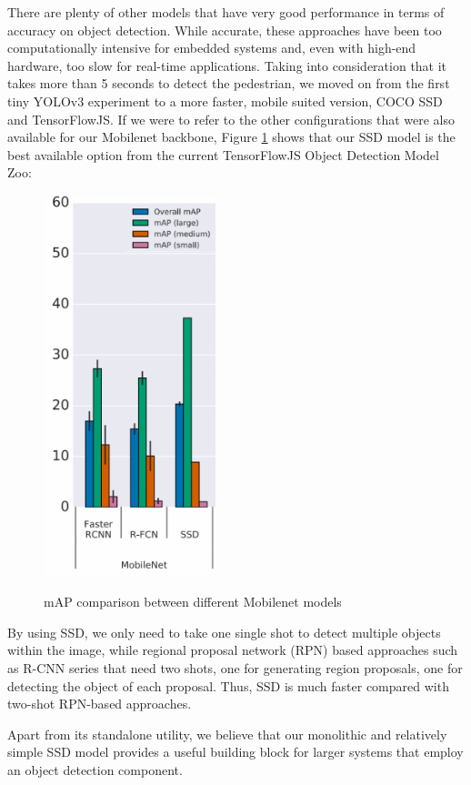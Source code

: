 \documentclass[runningheads,a4paper,11pt]{report}
\begin{document}
There are plenty of other models that have very good performance in terms of accuracy on object detection. While accurate, these approaches have been too computationally intensive for embedded systems and, even with high-end hardware, too slow for real-time applications. Taking into consideration that it takes more than 5 seconds to detect the pedestrian, we moved on from the first tiny YOLOv3 experiment to a more faster, mobile suited version, COCO SSD and TensorFlowJS. If we were to refer to the other configurations that were also available for our Mobilenet backbone, Figure \ref{fig:mob} shows that our SSD model is the best available option from the current TensorFlowJS Object Detection Model Zoo: 
\begin{figure}
\centering
    \includegraphics[width=5cm]{images/mobilenet.png}\\
\caption{mAP comparison between different Mobilenet models}\label{fig:mob}
\end{figure}
By using SSD, we only need to take one single shot to detect multiple objects within the image, while regional proposal network (RPN) based approaches such as R-CNN series that need two shots, one for generating region proposals, one for detecting the object of each proposal. Thus, SSD is much faster compared with two-shot RPN-based approaches.


Apart from its standalone utility, we believe that our monolithic and relatively simple SSD model provides a useful building block for larger systems that employ an object detection component. 
\end{document}

